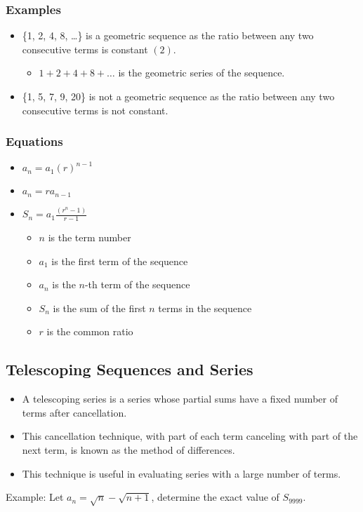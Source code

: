 \documentclass[12pt]{article}
\begin{document}
\subsubsection{Examples}
\begin{itemize}
    \item \{1, 2, 4, 8, \dots\} is a geometric sequence as the ratio between any two consecutive terms is constant $(2)$.
    \begin{itemize}
        \item $1 + 2 + 4 + 8 + \dots$ is the geometric series of the sequence.
    \end{itemize}
    \item \{1, 5, 7, 9, 20\} is not a geometric sequence as the ratio between any two consecutive terms is not constant.
\end{itemize} \newpage

\subsubsection{Equations}
\begin{itemize}
    \item $a_n = a_1(r)^{n-1}$
    \item $a_n = ra_{n-1}$
    \item $S_n = a_1\frac{(r^n - 1)}{r - 1}$
    \begin{itemize}
        \item $n$ is the term number
        \item $a_1$ is the first term of the sequence
        \item $a_n$ is the $n$-th term of the sequence
        \item $S_n$ is the sum of the first $n$ terms in the sequence
        \item $r$ is the common ratio
    \end{itemize}
\end{itemize}

\subsection{Telescoping Sequences and Series}
\begin{itemize}
    \item A telescoping series is a series whose partial sums have a fixed number of terms after cancellation. 
    \item This cancellation technique, with part of each term canceling with part of the next term, is known as the method of differences.
    \item This technique is useful in evaluating series with a large number of terms.
\end{itemize}
Example: Let $a_n = \sqrt{n} - \sqrt{n + 1}$, determine the exact value of $S_{9999}$. \\ 
\end{document}
